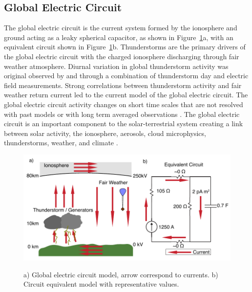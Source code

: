 \subsection{Global Electric Circuit}

The global electric circuit is the current system formed by the ionosphere and ground acting as a leaky spherical capacitor, as shown in Figure~\ref{intro:fig:gec}a, with an equivalent circuit shown in Figure~\ref{intro:fig:gec}b.
Thunderstorms are the primary drivers of the global electric circuit with the charged ionosphere discharging through fair weather atmosphere.
Diurnal variation in global thunderstorm activity was original observed by \citet{Wilson1921} and \citet{Whipple1929} through a combination of thunderstorm day and electric field measurements.
Strong correlations between thunderstorm activity and fair weather return current led to the current model of the global electric circuit.
The global electric circuit activity changes on short time scales that are not resolved with past models or with long term averaged observations \citep{Holzworth1984a}.
The global electric circuit is an important component to the solar-terrestrial system creating a link between solar activity, the ionosphere, aerosols, cloud microphysics, thunderstorms, weather, and climate \citep{Tinsley2007, Holzworth1986}.

\begin{figure}[ht!]
	\centering
	\includegraphics[scale=1]{Introduction/Figures/global_circuit.pdf}\\
	\caption{a) Global electric circuit model, arrow correspond to currents.
			b) Circuit equivalent model with representative values.}
	\label{intro:fig:gec}
\end{figure}

